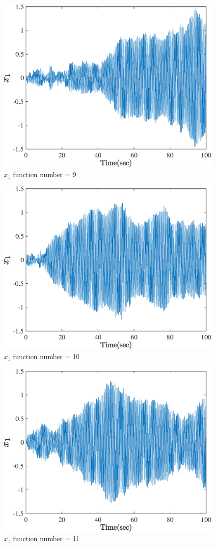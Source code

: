   \begin{figure}[H] 
  	\caption{$x_1$ function number = 9} 
  	\centering 
  	\includegraphics[width=12cm]{../Figure/Q5/part_a/9} 
  \end{figure}
  \begin{figure}[H] 
  	\caption{$x_1$ function number = 10} 
  	\centering 
  	\includegraphics[width=12cm]{../Figure/Q5/part_a/10} 
  \end{figure}
  \begin{figure}[H] 
  	\caption{$x_1$ function number = 11} 
  	\centering 
  	\includegraphics[width=12cm]{../Figure/Q5/part_a/11} 
  \end{figure}
